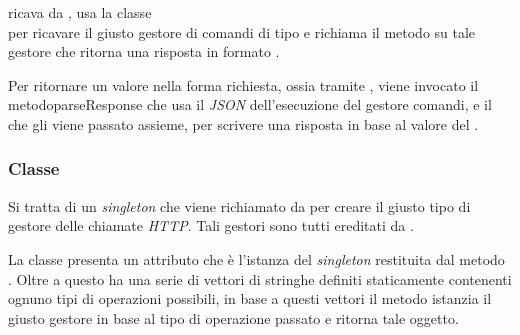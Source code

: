 \documentclass[tesi.tex]{subfiles}
\begin{document}
 ricava  da , usa la classe\\
  per ricavare il giusto gestore di
comandi di tipo  e richiama il metodo
 su tale gestore che ritorna una risposta in formato
.

Per ritornare un valore nella forma richiesta, ossia tramite
, viene invocato il metodo{parseResponse} che usa
il \emph{JSON} dell'esecuzione del gestore comandi, e il
 che gli viene passato assieme, per scrivere una
risposta in base al valore del .

\subsubsection{Classe }
\begin{center}
\end{center}
Si tratta di un \emph{singleton} che viene richiamato da
 per creare il giusto tipo di gestore delle
chiamate \emph{HTTP}. Tali gestori sono tutti ereditati da
.

La classe presenta un attributo  che \`e l'istanza del
\emph{singleton} restituita dal metodo . Oltre a
questo ha una serie di vettori di stringhe definiti staticamente
contenenti ognuno tipi di operazioni possibili, in base a questi
vettori il metodo  istanzia il giusto gestore in base al
tipo di operazione passato e ritorna tale oggetto.
\end{document}

